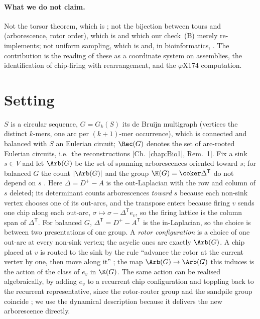 \paragraph{What we do not claim.} Not the torsor theorem, which is \cite[\S3]{HLMPPW}; not
the bijection between tours and (arborescence, rotor order), which is \cite[Cor.~4.10]{HLMPPW}
and which our check~(B) merely re-implements; not uniform sampling, which is
\cite{CMN,PW,CC} and, in bioinformatics, \cite{AE,KMUW,uShuffle}. The contribution is the
reading of these as a coordinate system on assemblies, the identification of chip-firing
with rearrangement, and the $\varphi$X174 computation.

\section{Setting}\label{Bio2:sec:setting}

$S$ is a circular sequence, $G=G_k(S)$ its de Bruijn multigraph (vertices the distinct
$k$-mers, one arc per $(k{+}1)$-mer occurrence), which is connected and balanced with $S$
an Eulerian circuit; $\Rec(G)$ denotes the set of arc-rooted Eulerian circuits, i.e.\ the
reconstructions [Ch.~\ref{chap:Bio1}, Rem.~1]. Fix a sink $s\in V$ and let $\Arb(G)$ be the set of
spanning arborescences oriented toward $s$; for balanced $G$ the count $|\Arb(G)|$ and the
group $\K(G)=\coker\Delta^{\mathsf T}$ do not depend on $s$ \cite[Lem.~4.12]{HLMPPW}.
Here $\Delta=D^{+}-A$ is the out-Laplacian with the row and column of $s$ deleted; its
determinant counts arborescences \emph{toward} $s$ because each non-sink vertex chooses
one of its out-arcs, and the transpose enters because firing $v$ sends one chip along
each out-arc, $\sigma\mapsto\sigma-\Delta^{\mathsf T}e_v$, so the firing lattice is the
column span of $\Delta^{\mathsf T}$. For balanced $G$, $\Delta^{\mathsf T}=D^{+}-A^{\mathsf T}$
is the in-Laplacian, so the choice is between two presentations of one group. A
\emph{rotor configuration} is a choice of one out-arc at every non-sink vertex; the
acyclic ones are exactly $\Arb(G)$. A chip placed at $v$ is routed to the sink by the
rule ``advance the rotor at the current vertex by one, then move along it''
\cite[\S3]{HLMPPW}; the map $\Arb(G)\to\Arb(G)$ this induces is the action of the class of
$e_v$ in $\K(G)$. The same action can be realised algebraically, by adding $e_v$ to a
recurrent chip configuration and toppling back to the recurrent representative, since
the rotor-router group and the sandpile group coincide \cite[Lem.~3.19]{HLMPPW}; we use
the dynamical description because it delivers the new arborescence directly.

